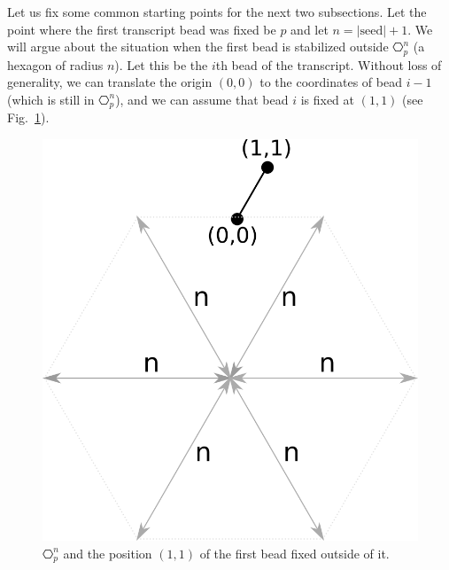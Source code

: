 Let us fix some common starting points for the next two subsections. Let the point where the first transcript bead was fixed be $p$ and let $n=|\mathrm{seed}|+1$. We will argue about the situation when the first bead is stabilized outside $\hexagon_p^n$ (a hexagon of radius $n$). Let this be the $i$th bead of the transcript. Without loss of generality, we can translate the origin $(0,0)$ to the coordinates of bead $i-1$ (which is still in $\hexagon_p^n$), and we can assume that bead $i$ is fixed at $(1,1)$ (see Fig.~\ref{fig:hexagonOut}).
\begin{figure}
	\centering
	\includegraphics[width=0.3\linewidth]{./Fig/hexagonOut}
	\caption{$\hexagon_p^n$ and the position $(1,1)$ of the first bead fixed outside of it.}
	\label{fig:hexagonOut}
\end{figure}


